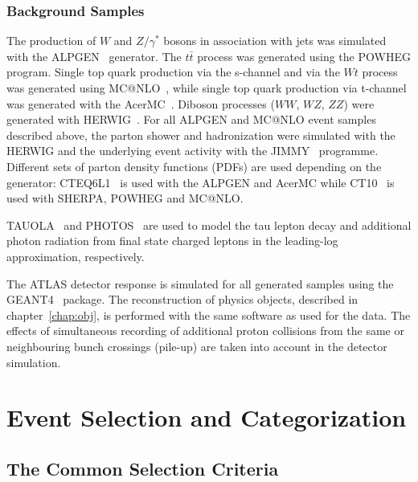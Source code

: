 \subsubsection{Background Samples}
The production of $W$ and $Z/\gamma^*$ bosons in association with jets
was simulated with the ALPGEN~\cite{Alpgen} generator. 
The $t\bar{t}$ process was generated using the POWHEG program. Single top quark 
production via the  s-channel and via the   $Wt$ process was
 generated using MC@NLO~\cite{MCatNLO}, while single top quark production via 
t-channel  was generated with the AcerMC~\cite{AcerMC}.  Diboson processes ($WW$, $WZ$, $ZZ$) were generated with
 HERWIG~\cite{Herwig}.  For all ALPGEN  
and MC@NLO event samples described
above, the parton shower and hadronization were simulated with the  HERWIG
and the underlying event activity with the JIMMY~\cite{JIMMY} programme.
Different sets of parton density functions (PDFs)  are used depending on
the generator: CTEQ6L1~\cite{CTEQ6} is used with the ALPGEN and AcerMC while
CT10~\cite{CT10} is used with SHERPA, POWHEG and MC@NLO. 

TAUOLA~\cite{TAUOLA} and PHOTOS~\cite{PHOTOS} are used to model the
tau lepton decay and additional photon radiation from final state charged leptons
in the leading-log approximation, respectively.

The ATLAS detector response is simulated for all generated samples using the GEANT4~\cite{Geant4,ATLASSIM} package.
The reconstruction of physics objects, described in chapter~\ref{chap:obj}, is performed with the same software as used for 
the data.
The effects of simultaneous recording of additional proton collisions from the
same or neighbouring bunch crossings (pile-up) are taken into account in the detector
simulation. 



\section{Event Selection and Categorization}\label{sec:selection}


\subsection{The Common Selection Criteria}\label{sec:presel}

